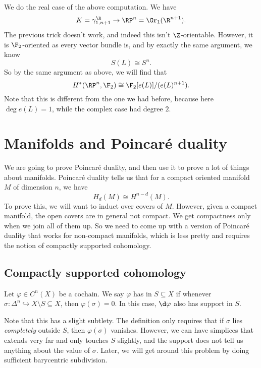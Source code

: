 \documentclass[a4paper]{article}
\theoremstyle{definition}
\begin{document}
\begin{eg}
  We do the real case of the above computation. We have
  \[
    K = \gamma_{1, n + 1}^\R \to \RP^n = \Gr_1(\R^{n + 1}).
  \]
  The previous trick doesn't work, and indeed this isn't $\Z$-orientable. However, it is $\F_2$-oriented as every vector bundle is, and by exactly the same argument, we know
  \[
    S(L) \cong S^n.
  \]
  So by the same argument as above, we will find that
  \[
    H^*(\RP^n, \F_2) \cong \F_2[e(L)]/(e(L)^{n + 1}).
  \]
  Note that this is different from the one we had before, because here $\deg e(L) = 1$, while the complex case had degree $2$.
\end{eg}

\section{Manifolds and \texorpdfstring{Poincar\'e}{Poincare} duality}
We are going to prove Poincar\'e duality, and then use it to prove a lot of things about manifolds. Poincar\'e duality tells us that for a compact oriented manifold $M$ of dimension $n$, we have
\[
  H_d(M) \cong H^{n - d}(M).
\]
To prove this, we will want to induct over covers of $M$. However, given a compact manifold, the open covers are in general not compact. We get compactness only when we join all of them up. So we need to come up with a version of Poincar\'e duality that works for non-compact manifolds, which is less pretty and requires the notion of compactly supported cohomology.

\subsection{Compactly supported cohomology}

\begin{defi}
  Let $\varphi \in C^n(X)$ be a cochain. We say $\varphi$ has  in $S \subseteq X$ if whenever $\sigma: \Delta^n \hookrightarrow X \setminus S \subseteq X$, then $\varphi(\sigma) = 0$. In this case, $\d \varphi$ also has support in $S$.
\end{defi}
Note that this has a slight subtlety. The definition only requires that if $\sigma$ lies \emph{completely} outside $S$, then $\varphi(\sigma)$ vanishes. However, we can have simplices that extends very far and only touches $S$ slightly, and the support does not tell us anything about the value of $\sigma$. Later, we will get around this problem by doing sufficient barycentric subdivision.
\end{document}
